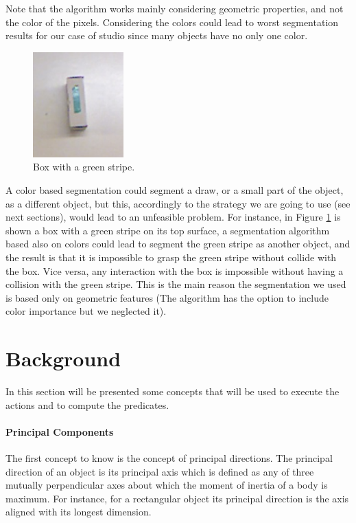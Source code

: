 Note that the algorithm works mainly considering geometric properties, and not the color of the pixels. Considering the colors could lead to worst segmentation results for our case of studio since many objects have no only one color.

\begin{figure}
\centering
\caption{Box with a green stripe.}\label{fig:seg_color}
\includegraphics[width=3.5cm]{Img/ObjectSegmentation/color_seg_problem.png}
\end{figure}
A color based segmentation could segment a draw, or a small part of the object, as a different object, but this, accordingly to the strategy we are going to use (see next sections), would lead to an unfeasible problem. 
For instance, in Figure \ref{fig:seg_color} is shown a box with a green stripe on its top surface, a segmentation algorithm based also on colors could lead to segment the green stripe as another object, and the result is that it is impossible to grasp the green stripe without collide with the box. Vice versa, any interaction with the box is impossible without having a collision with the green stripe. This is the main reason the segmentation we used is based only on geometric features (The  algorithm has the option to include color importance but we neglected it). 


\section{Background}

In this section will be presented some concepts that will be used to execute the actions and to compute the predicates. 

\paragraph{Principal Components}
The first concept to know is the concept of principal directions. The principal direction of an object is its principal axis which is defined as any of three mutually perpendicular axes about which the moment of inertia of a body is maximum. For instance, for a rectangular object its principal direction is the axis aligned with its longest dimension. 

